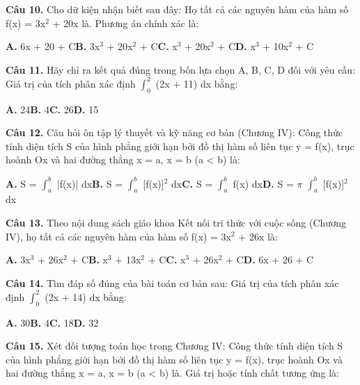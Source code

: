 \documentclass[11pt,a4paper]{article}
\begin{document}
\textbf{\color{primary} Câu 10.} Cho dữ kiện nhận biết sau đây: Họ tất cả các nguyên hàm của hàm số f(x) = 3x$^2$ + 20x là. Phương án chính xác là:\par
\hspace*{1.5em}\textbf{A.} 6x + 20 + C\quad\quad \textbf{B.} 3x$^3$ + 20x$^2$ + C\quad\quad \textbf{C.} x$^3$ + 20x$^2$ + C\quad\quad \textbf{D.} x$^3$ + 10x$^2$ + C\par\vspace{2pt}
\textbf{\color{primary} Câu 11.} Hãy chỉ ra kết quả đúng trong bốn lựa chọn A, B, C, D đối với yêu cầu: Giá trị của tích phân xác định $\int_{0}^{2}$ (2x + 11) dx bằng:\par
\hspace*{1.5em}\textbf{A.} 24\quad\quad \textbf{B.} 4\quad\quad \textbf{C.} 26\quad\quad \textbf{D.} 15\par\vspace{2pt}
\textbf{\color{primary} Câu 12.} Câu hỏi ôn tập lý thuyết và kỹ năng cơ bản (Chương IV): Công thức tính diện tích S của hình phẳng giới hạn bởi đồ thị hàm số liên tục y = f(x), trục hoành Ox và hai đường thẳng x = a, x = b (a < b) là:\par
\hspace*{1.5em}\textbf{A.} S = $\int_{a}^{b}$ |f(x)| dx\quad\quad \textbf{B.} S = $\int_{a}^{b}$ [f(x)]$^2$ dx\quad\quad \textbf{C.} S = $\int_{a}^{b}$ f(x) dx\quad\quad \textbf{D.} S = $\pi$ $\int_{a}^{b}$ [f(x)]$^2$ dx\par\vspace{2pt}
\textbf{\color{primary} Câu 13.} Theo nội dung sách giáo khoa Kết nối tri thức với cuộc sống (Chương IV), họ tất cả các nguyên hàm của hàm số f(x) = 3x$^2$ + 26x là:\par
\hspace*{1.5em}\textbf{A.} 3x$^3$ + 26x$^2$ + C\quad\quad \textbf{B.} x$^3$ + 13x$^2$ + C\quad\quad \textbf{C.} x$^3$ + 26x$^2$ + C\quad\quad \textbf{D.} 6x + 26 + C\par\vspace{2pt}
\textbf{\color{primary} Câu 14.} Tìm đáp số đúng của bài toán cơ bản sau: Giá trị của tích phân xác định $\int_{0}^{2}$ (2x + 14) dx bằng:\par
\hspace*{1.5em}\textbf{A.} 30\quad\quad \textbf{B.} 4\quad\quad \textbf{C.} 18\quad\quad \textbf{D.} 32\par\vspace{2pt}
\textbf{\color{primary} Câu 15.} Xét đối tượng toán học trong Chương IV: Công thức tính diện tích S của hình phẳng giới hạn bởi đồ thị hàm số liên tục y = f(x), trục hoành Ox và hai đường thẳng x = a, x = b (a < b) là. Giá trị hoặc tính chất tương ứng là:\par
\end{document}
